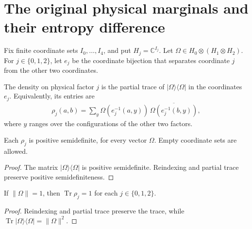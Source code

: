 \section{The original physical marginals and their entropy difference}

Fix finite coordinate sets $I_0,\ldots,I_4$, and put $H_j=\mathbb C^{I_j}$.
Let $\Omega\in H_0\otimes(H_1\otimes H_2)$. For $j\in\{0,1,2\}$,
let $e_j$ be the coordinate bijection that separates coordinate $j$
from the other two coordinates.

\begin{definition}
  \label{def:physical_singleton_density}
  \leanok
  The density on physical factor $j$ is the partial trace of
  $|\Omega\rangle\langle\Omega|$ in the coordinates $e_j$.
  Equivalently, its entries are
  \begin{align*}
    \rho_j(a,b)=\sum_y
      \Omega(e_j^{-1}(a,y))\,
      \overline{\Omega(e_j^{-1}(b,y))},
  \end{align*}
  where $y$ ranges over the configurations of the other two factors.
\end{definition}

\begin{theorem}
  \label{thm:physical_singleton_density_positive}
  \leanok
  Each $\rho_j$ is positive semidefinite, for every vector $\Omega$.
  Empty coordinate sets are allowed.
\end{theorem}
\begin{proof}\leanok
  The matrix $|\Omega\rangle\langle\Omega|$ is positive semidefinite.
  Reindexing and partial trace preserve positive semidefiniteness.
\end{proof}

\begin{theorem}
  \label{thm:physical_singleton_density_trace}
  \leanok
  If $\|\Omega\|=1$, then $\operatorname{Tr}\rho_j=1$ for each
  $j\in\{0,1,2\}$.
\end{theorem}
\begin{proof}\leanok
  Reindexing and partial trace preserve the trace, while
  $\operatorname{Tr}|\Omega\rangle\langle\Omega|=\|\Omega\|^2$.
\end{proof}

